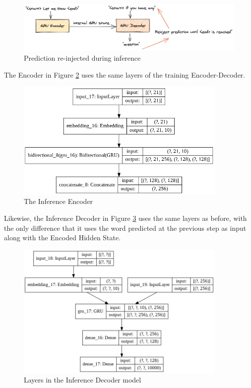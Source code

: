 \documentclass{article}
\begin{document}
\begin{figure}[htbp]
\centering
\includegraphics[width=7in]{images/autoencoder-inference}
\caption{Prediction re-injected during inference}
\label{autoencoder-inference}
\end{figure}

The Encoder in Figure \ref{encoder} uses the same layers of the training Encoder-Decoder.

\begin{figure}[htbp]
\centering
\includegraphics[width=4in]{images/encoder.png}
\caption{The Inference Encoder}
\label{encoder}
\end{figure}

Likewise, the Inference Decoder in Figure \ref{inf-model} uses the same layers as before, with the only difference that it uses the word predicted at the previous step as input along with the Encoded Hidden State.

\begin{figure}[htbp]
\centering
\includegraphics[width=4in]{images/inf-model.png}
\caption{Layers in the Inference Decoder model}
\label{inf-model}
\end{figure}
\end{document}
